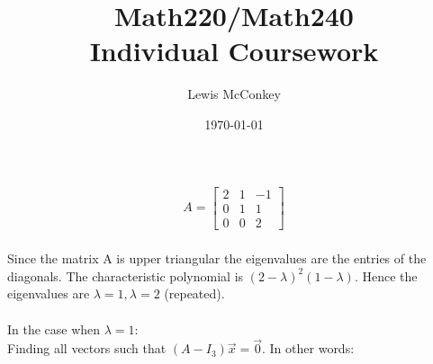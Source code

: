 \documentclass[reqno,a4paper,12pt]{amsart}
\author{Lewis McConkey}
\date{\today}
\title{ \LARGE{Math220/Math240} \\
   \setstretch{1}Individual Coursework}
\begin{document}
\maketitle
 
 \begin{align}
    A 
    =
    \begin{bmatrix}
        2  &  1  &  -1  \\
        0  &  1  &   1  \\
        0  &  0  &  2
    \end{bmatrix} \label{eq:1}
  \end{align}\\
Since the matrix A is upper triangular the eigenvalues are the entries of the diagonals. The characteristic polynomial is $(2-\lambda)^2(1-\lambda)$. Hence the eigenvalues are $\lambda = 1,  \lambda = 2$ (repeated).\\
\\In the case when $\lambda = 1$:\\
Finding all vectors such that $(A- I_{3}) \overrightarrow{x} = \overrightarrow{0}$. In other words:\\
\end{document}
